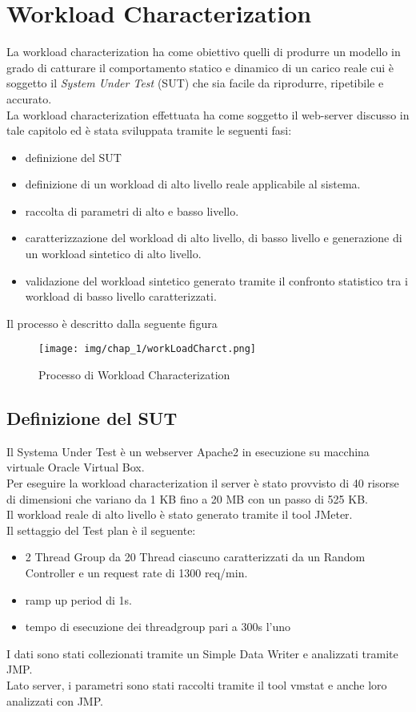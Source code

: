 \section{Workload Characterization}
La workload characterization ha come obiettivo quelli di produrre un modello in grado di catturare il comportamento statico e dinamico di un carico reale cui è soggetto il \textit{System Under Test} (SUT) che sia facile da riprodurre, ripetibile e accurato.\\
La workload characterization effettuata ha come soggetto il web-server discusso in tale capitolo ed è stata sviluppata tramite le seguenti fasi:
\begin{itemize}
    \item definizione del SUT 
    \item definizione di un workload di alto livello reale applicabile al sistema.
    \item raccolta di parametri di alto e basso livello.
    \item caratterizzazione del workload di alto livello, di basso livello e generazione di un workload sintetico di alto livello.
    \item validazione del workload sintetico generato tramite il confronto statistico tra i workload di basso livello caratterizzati.
\end{itemize}
Il processo è descritto dalla seguente figura
\begin{figure}[H]
    \centering
    \texttt{[image: img/chap\_1/workLoadCharct.png]}
    \caption{Processo di Workload Characterization}
    \label{fig:workLC}
\end{figure}
\subsection{Definizione del SUT}
Il Systema Under Test è un webserver Apache2 in esecuzione su macchina virtuale Oracle Virtual Box.\\
Per eseguire la workload characterization il server è stato provvisto di 40 risorse di dimensioni che variano da 1 KB fino a 20 MB con un passo di 525 KB.\\
Il workload reale di alto livello è stato generato tramite il tool JMeter.\\
Il settaggio del Test plan è il seguente:
\begin{itemize}
    \item 2 Thread Group da 20 Thread ciascuno caratterizzati da un Random Controller e un request rate di 1300 req/min.
    \item ramp up period di 1s.
    \item tempo di esecuzione dei threadgroup pari a 300s l'uno
\end{itemize}
I dati sono stati collezionati tramite un Simple Data Writer e analizzati tramite JMP.\\
Lato server, i parametri sono stati raccolti tramite il tool vmstat e anche loro analizzati con JMP.
